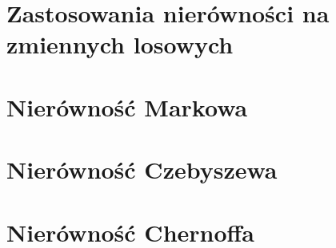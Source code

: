 \section{Zastosowania nierówności na zmiennych losowych}


\section{Nierówność Markowa}


\section{Nierówność Czebyszewa}


\section{Nierówność Chernoffa}


